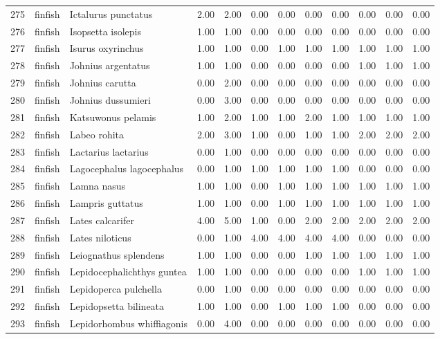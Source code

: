 \begin{table}[ht]
\begin{tabular}{rllrrrrrrrrr}
  275 & finfish & Ictalurus punctatus & 2.00 & 2.00 & 0.00 & 0.00 & 0.00 & 0.00 & 0.00 & 0.00 & 0.00 \\ 
  276 & finfish & Isopsetta isolepis & 1.00 & 1.00 & 0.00 & 0.00 & 0.00 & 0.00 & 0.00 & 0.00 & 0.00 \\ 
  277 & finfish & Isurus oxyrinchus & 1.00 & 1.00 & 0.00 & 1.00 & 1.00 & 1.00 & 1.00 & 1.00 & 1.00 \\ 
  278 & finfish & Johnius argentatus & 1.00 & 1.00 & 0.00 & 0.00 & 0.00 & 0.00 & 1.00 & 1.00 & 1.00 \\ 
  279 & finfish & Johnius carutta & 0.00 & 2.00 & 0.00 & 0.00 & 0.00 & 0.00 & 0.00 & 0.00 & 0.00 \\ 
  280 & finfish & Johnius dussumieri & 0.00 & 3.00 & 0.00 & 0.00 & 0.00 & 0.00 & 0.00 & 0.00 & 0.00 \\ 
  281 & finfish & Katsuwonus pelamis & 1.00 & 2.00 & 1.00 & 1.00 & 2.00 & 1.00 & 1.00 & 1.00 & 1.00 \\ 
  282 & finfish & Labeo rohita & 2.00 & 3.00 & 1.00 & 0.00 & 1.00 & 1.00 & 2.00 & 2.00 & 2.00 \\ 
  283 & finfish & Lactarius lactarius & 0.00 & 1.00 & 0.00 & 0.00 & 0.00 & 0.00 & 0.00 & 0.00 & 0.00 \\ 
  284 & finfish & Lagocephalus lagocephalus & 0.00 & 1.00 & 1.00 & 1.00 & 1.00 & 1.00 & 0.00 & 0.00 & 0.00 \\ 
  285 & finfish & Lamna nasus & 1.00 & 1.00 & 0.00 & 1.00 & 1.00 & 1.00 & 1.00 & 1.00 & 1.00 \\ 
  286 & finfish & Lampris guttatus & 1.00 & 1.00 & 0.00 & 1.00 & 1.00 & 1.00 & 1.00 & 1.00 & 1.00 \\ 
  287 & finfish & Lates calcarifer & 4.00 & 5.00 & 1.00 & 0.00 & 2.00 & 2.00 & 2.00 & 2.00 & 2.00 \\ 
  288 & finfish & Lates niloticus & 0.00 & 1.00 & 4.00 & 4.00 & 4.00 & 4.00 & 0.00 & 0.00 & 0.00 \\ 
  289 & finfish & Leiognathus splendens & 1.00 & 1.00 & 0.00 & 0.00 & 1.00 & 1.00 & 1.00 & 1.00 & 1.00 \\ 
  290 & finfish & Lepidocephalichthys guntea & 1.00 & 1.00 & 0.00 & 0.00 & 0.00 & 0.00 & 1.00 & 1.00 & 1.00 \\ 
  291 & finfish & Lepidoperca pulchella & 0.00 & 1.00 & 0.00 & 0.00 & 0.00 & 0.00 & 0.00 & 0.00 & 0.00 \\ 
  292 & finfish & Lepidopsetta bilineata & 1.00 & 1.00 & 0.00 & 1.00 & 1.00 & 1.00 & 0.00 & 0.00 & 0.00 \\ 
  293 & finfish & Lepidorhombus whiffiagonis & 0.00 & 4.00 & 0.00 & 0.00 & 0.00 & 0.00 & 0.00 & 0.00 & 0.00 \\ 

\end{tabular}
\end{table}
